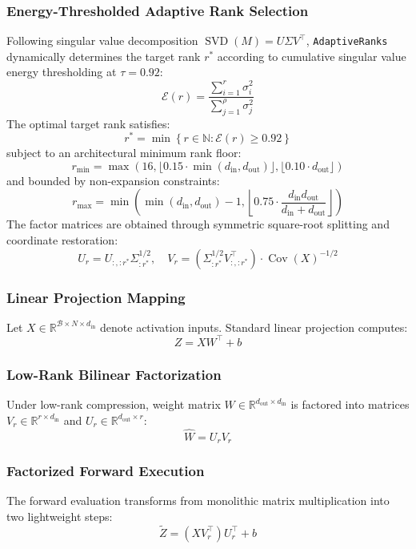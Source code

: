 \subsubsection{Energy-Thresholded Adaptive Rank Selection}
\label{sec:adaptive_rank_selection}
Following singular value decomposition $\operatorname{SVD}(M) = U \Sigma V^\top$, \texttt{AdaptiveRanks} dynamically determines the target rank $r^*$ according to cumulative singular value energy thresholding at $\tau = 0.92$:
\[
\mathcal{E}(r) = \frac{\sum_{i=1}^r \sigma_i^2}{\sum_{j=1}^\rho \sigma_j^2}
\]
The optimal target rank satisfies:
\[
r^* = \min \left\{ r \in \mathbb{N} : \mathcal{E}(r) \ge 0.92 \right\}
\]
subject to an architectural minimum rank floor:
\[
r_{\min} = \max\left(16, \lfloor 0.15 \cdot \min(d_{\text{in}}, d_{\text{out}})\rfloor, \lfloor 0.10 \cdot d_{\text{out}}\rfloor\right)
\]
and bounded by non-expansion constraints:
\[
r_{\max} = \min\left(\min(d_{\text{in}}, d_{\text{out}}) - 1, \left\lfloor 0.75 \cdot \frac{d_{\text{in}} d_{\text{out}}}{d_{\text{in}} + d_{\text{out}}}\right\rfloor\right)
\]
The factor matrices are obtained through symmetric square-root splitting and coordinate restoration:
\[
U_r = U_{:, :r^*} \Sigma_{:r^*}^{1/2}, \quad V_r = \left(\Sigma_{:r^*}^{1/2} V_{:, :r^*}^\top\right) \cdot \operatorname{Cov}(X)^{-1/2}
\]

\subsubsection{Linear Projection Mapping}
Let $X \in \mathbb{R}^{\mathcal{B} \times N \times d_{\text{in}}}$ denote activation inputs. Standard linear projection computes:
\[
Z = X W^\top + b
\]

\subsubsection{Low-Rank Bilinear Factorization}
Under low-rank compression, weight matrix $W \in \mathbb{R}^{d_{\text{out}} \times d_{\text{in}}}$ is factored into matrices $V_r \in \mathbb{R}^{r \times d_{\text{in}}}$ and $U_r \in \mathbb{R}^{d_{\text{out}} \times r}$:
\[
\hat{W} = U_r V_r
\]

\subsubsection{Factorized Forward Execution}
The forward evaluation transforms from monolithic matrix multiplication into two lightweight steps:
\[
\tilde{Z} = (X V_r^\top) U_r^\top + b
\]

